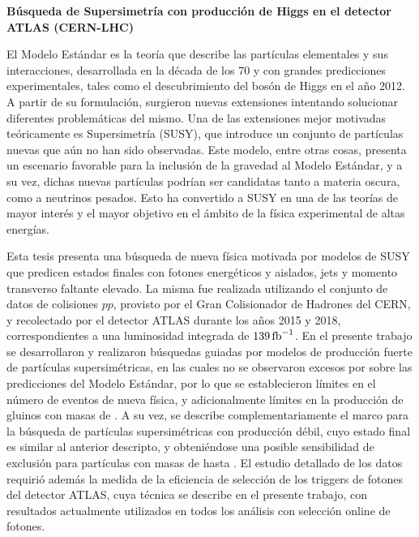 \thispagestyle{empty}

{\centering \bf \Large  Búsqueda de Supersimetría con producción de Higgs en el detector ATLAS (CERN-LHC)\\}

\vspace{2cm}

El Modelo Estándar es la teoría que describe las partículas elementales y sus interacciones, desarrollada en la década de los 70 y con grandes predicciones experimentales, tales como el descubrimiento del bosón de Higgs en el año 2012. A partir de su formulación, surgieron nuevas extensiones intentando solucionar diferentes problemáticas del mismo. Una de las extensiones mejor motivadas teóricamente es Supersimetría (SUSY), que introduce un conjunto de partículas nuevas que aún no han sido observadas. Este modelo, entre otras cosas, presenta un escenario favorable para la inclusión de la gravedad al Modelo Estándar, y a su vez, dichas nuevas partículas podrían ser candidatas tanto a materia oscura, como a neutrinos pesados. Esto ha convertido a SUSY en una de las teorías de mayor interés y el mayor objetivo en el ámbito de la física experimental de altas energías.

Esta tesis presenta una búsqueda de nueva física motivada por modelos de SUSY que predicen estados finales con fotones energéticos y aislados, jets y momento transverso faltante elevado. La misma fue realizada utilizando el conjunto de datos de colisiones $pp$, provisto por el Gran Colisionador de Hadrones del CERN, y recolectado por el detector ATLAS durante los años 2015 y 2018, correspondientes a una luminosidad integrada de $139\,\text{fb}^{-1}$. En el presente trabajo se desarrollaron y realizaron búsquedas guiadas por modelos de producción fuerte de partículas supersimétricas, en las cuales no se observaron excesos por sobre las predicciones del Modelo Estándar, por lo que se establecieron límites en el número de eventos de nueva física, y adicionalmente límites en la producción de gluinos con masas de . A su vez, se describe complementariamente el marco para la búsqueda de partículas supersimétricas con producción débil, cuyo estado final es similar al anterior descripto, y obteniéndose una posible sensibilidad de exclusión para partículas con masas de hasta . El estudio detallado de los datos requirió además la medida de la eficiencia de selección de los triggers de fotones del detector ATLAS, cuya técnica se describe en el presente trabajo, con resultados actualmente utilizados en todos los análisis con selección online de fotones.

